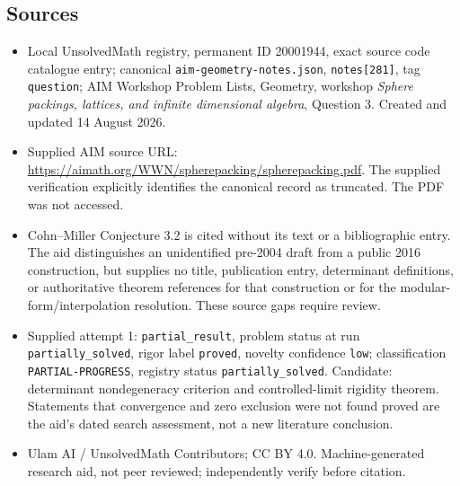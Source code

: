 \documentclass[11pt]{article}
\begin{document}
\subsection{Sources}
\begin{itemize}
\item Local UnsolvedMath registry, permanent ID 20001944, exact source code catalogue entry; canonical \texttt{aim-geometry-notes.json}, \texttt{notes[281]}, tag \texttt{question}; AIM Workshop Problem Lists, Geometry, workshop \emph{Sphere packings, lattices, and infinite dimensional algebra}, Question 3. Created and updated 14 August 2026.
\item Supplied AIM source URL: \url{https://aimath.org/WWN/spherepacking/spherepacking.pdf}. The supplied verification explicitly identifies the canonical record as truncated. The PDF was not accessed.
\item Cohn--Miller Conjecture 3.2 is cited without its text or a bibliographic entry. The aid distinguishes an unidentified pre-2004 draft from a public 2016 construction, but supplies no title, publication entry, determinant definitions, or authoritative theorem references for that construction or for the modular-form/interpolation resolution. These source gaps require review.
\item Supplied attempt 1: \texttt{partial\_result}, problem status at run \texttt{partially\_solved}, rigor label \texttt{proved}, novelty confidence \texttt{low}; classification \texttt{PARTIAL-PROGRESS}, registry status \texttt{partially\_solved}. Candidate: determinant nondegeneracy criterion and controlled-limit rigidity theorem. Statements that convergence and zero exclusion were not found proved are the aid's dated search assessment, not a new literature conclusion.
\item Ulam AI / UnsolvedMath Contributors; CC BY 4.0. Machine-generated research aid, not peer reviewed; independently verify before citation.
\end{itemize}
\end{document}
